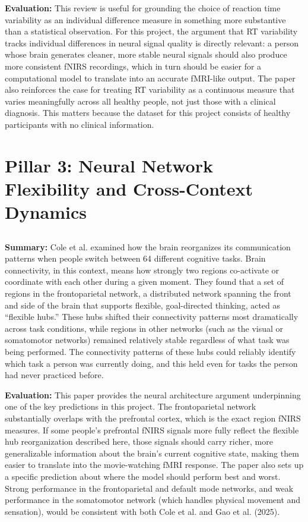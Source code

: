 \documentclass[12pt]{article}
\begin{document}
\textbf{Evaluation:} This review is useful for grounding the choice of reaction time variability as an individual difference measure in something more substantive than a statistical observation. For this project, the argument that RT variability tracks individual differences in neural signal quality is directly relevant: a person whose brain generates cleaner, more stable neural signals should also produce more consistent fNIRS recordings, which in turn should be easier for a computational model to translate into an accurate fMRI-like output. The paper also reinforces the case for treating RT variability as a continuous measure that varies meaningfully across all healthy people, not just those with a clinical diagnosis. This matters because the dataset for this project consists of healthy participants with no clinical information.

\section*{Pillar 3: Neural Network Flexibility and Cross-Context Dynamics}

\subsection*{\cite{cole2013}}
\textbf{Summary:} Cole et al. examined how the brain reorganizes its communication patterns when people switch between 64 different cognitive tasks. Brain connectivity, in this context, means how strongly two regions co-activate or coordinate with each other during a given moment. They found that a set of regions in the frontoparietal network, a distributed network spanning the front and side of the brain that supports flexible, goal-directed thinking, acted as ``flexible hubs.'' These hubs shifted their connectivity patterns most dramatically across task conditions, while regions in other networks (such as the visual or somatomotor networks) remained relatively stable regardless of what task was being performed. The connectivity patterns of these hubs could reliably identify which task a person was currently doing, and this held even for tasks the person had never practiced before.

\textbf{Evaluation:} This paper provides the neural architecture argument underpinning one of the key predictions in this project. The frontoparietal network substantially overlaps with the prefrontal cortex, which is the exact region fNIRS measures. If some people's prefrontal fNIRS signals more fully reflect the flexible hub reorganization described here, those signals should carry richer, more generalizable information about the brain's current cognitive state, making them easier to translate into the movie-watching fMRI response. The paper also sets up a specific prediction about where the model should perform best and worst. Strong performance in the frontoparietal and default mode networks, and weak performance in the somatomotor network (which handles physical movement and sensation), would be consistent with both Cole et al. and Gao et al. (2025).
\end{document}
